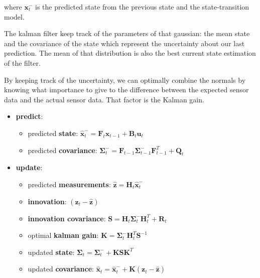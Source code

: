 \documentclass[12pt,]{article}
\providecommand{\tightlist}{%
  \setlength{\itemsep}{0pt}\setlength{\parskip}{0pt}}
\begin{document}
where \(\mathbf{x}^{-}_{t}\) is the predicted state from the previous
state and the state-transition model.

The kalman filter keep track of the parameters of that gaussian: the
mean state and the covariance of the state which represent the
uncertainty about our last prediction. The mean of that distribution is
also the best current state estimation of the filter.

By keeping track of the uncertainty, we can optimally combine the
normals by knowing what importance to give to the difference between the
expected sensor data and the actual sensor data. That factor is the
Kalman gain.

\begin{itemize}
\tightlist
\item
  \textbf{predict}:

  \begin{itemize}
  \tightlist
  \item
    predicted \textbf{state}:
    \(\hat{\mathbf{x}}^{-}_t = \mathbf{F}_t \mathbf{x}_{t-1} + \mathbf{B}_t \mathbf{u}_t\)
  \item
    predicted \textbf{covariance}:
    \(\mathbf{\Sigma}^{-}_t = \mathbf{F}_{t-1} \mathbf{\Sigma}^{-}_{t-1} \mathbf{F}_{t-1}^T + \mathbf{Q}_t\)
  \end{itemize}
\item
  \textbf{update}:

  \begin{itemize}
  \tightlist
  \item
    predicted \textbf{measurements}:
    \(\hat{\mathbf{z}} = \mathbf{H}_t \hat{\mathbf{x}}^{-}_t\)
  \item
    \textbf{innovation}: \((\mathbf{z}_t - \hat{\mathbf{z}})\)\\
  \item
    \textbf{innovation covariance}:
    \(\mathbf{S} = \mathbf{H}_t \mathbf{\Sigma}^{-}_t \mathbf{H}_t^T + \mathbf{R}_t\)\\
  \item
    optimal \textbf{kalman gain}:
    \(\mathbf{K} = \mathbf{\Sigma}^{-}_t \mathbf{H}_t^T \mathbf{S}^{-1}\)
  \item
    updated \textbf{state}:
    \(\mathbf{\Sigma}_t = \mathbf{\Sigma}^-_t + \mathbf{K} \mathbf{S} \mathbf{K}^T\)
  \item
    updated \textbf{covariance}:
    \(\hat{\mathbf{x}}_t = \hat{\mathbf{x}}^{-}_t + \mathbf{K}(\mathbf{z}_t - \hat{\mathbf{z}})\)
  \end{itemize}
\end{itemize}
\end{document}
